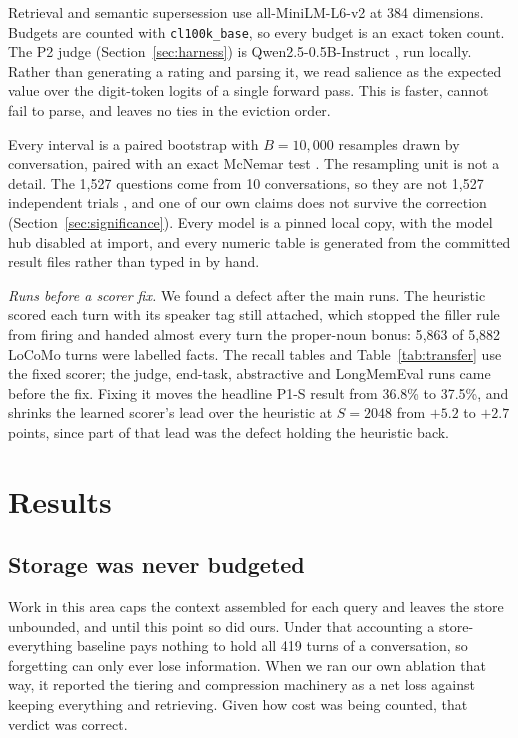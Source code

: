 Retrieval and semantic supersession use all-MiniLM-L6-v2
\cite{reimers2019sbert} at 384 dimensions. Budgets are counted with
\texttt{cl100k\_base}, so every budget is an exact token count. The P2 judge
(Section~\ref{sec:harness}) is Qwen2.5-0.5B-Instruct \cite{qwen2025}, run locally. Rather than generating a
rating and parsing it, we read salience as the expected value over the
digit-token logits of a single forward pass. This is faster, cannot fail to
parse, and leaves no ties in the eviction order.

Every interval is a paired bootstrap \cite{efron1993bootstrap} with
$B=10{,}000$ resamples drawn by conversation, paired with an exact McNemar test
\cite{mcnemar1947,dietterich1998tests}. The resampling unit is not a detail.
The 1{,}527 questions come from 10 conversations, so they are not 1{,}527
independent trials
\cite{cameron2008cluster}, and one of our own claims does not survive the
correction (Section~\ref{sec:significance}). Every model is a pinned local
copy, with the model hub disabled at import, and every numeric table is
generated from the committed result files rather than typed in by hand.

\emph{Runs before a scorer fix.} We found a defect after the main runs. The heuristic scored each turn
with its speaker tag still attached, which stopped the filler rule from firing
and handed almost every turn the proper-noun bonus: 5{,}863 of 5{,}882 LoCoMo
turns were labelled facts. The recall tables and Table~\ref{tab:transfer} use
the fixed scorer; the judge, end-task, abstractive and LongMemEval runs came
before the fix. Fixing it moves the headline P1-S result from 36.8\% to
37.5\%, and shrinks the learned scorer's lead over the heuristic at $S=2048$
from $+5.2$ to $+2.7$ points, since part of that lead was the defect holding
the heuristic back.
\label{sec:prefix}

\section{Results}
\label{sec:results}

\subsection{Storage was never budgeted}
\label{sec:accounting}

Work in this area caps the context assembled for each query and leaves the
store unbounded, and until this point so did ours. Under that accounting a
store-everything baseline pays nothing to hold all 419 turns of a
conversation, so forgetting can only ever lose information. When we ran our
own ablation that way, it reported the tiering and compression machinery as a
net loss against keeping everything and retrieving. Given how cost was being
counted, that verdict was correct.

